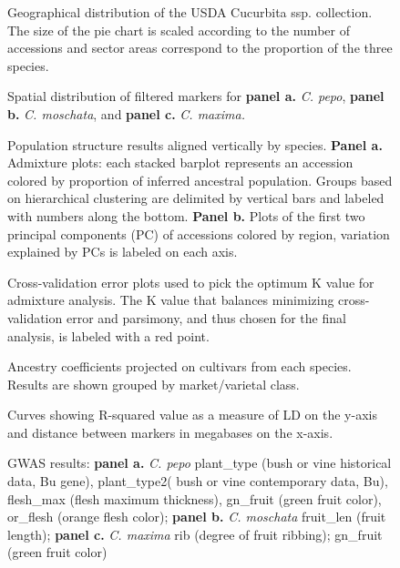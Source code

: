 \documentclass[utf8]{FrontiersinHarvard} %
\begin{document}
\begin{figure}[h]
	\caption{Geographical distribution of the USDA Cucurbita ssp. collection. The size of the pie chart is scaled according to the number of accessions and sector areas correspond to the proportion of the three species. \label{fig:1}}
\end{figure}

\begin{figure}[h]
	\caption{Spatial distribution of filtered markers for \textbf{panel a.} \textit{C. pepo}, \textbf{panel b.} \textit{C. moschata}, and \textbf{panel c.} \textit{C. maxima.} \label{fig:2}}
\end{figure}

\begin{figure}[h]
	\caption{Population structure results aligned vertically by species. \textbf{Panel a.} Admixture plots: each stacked barplot represents an accession colored by proportion of inferred ancestral population. Groups based on hierarchical clustering are delimited by vertical bars and labeled with numbers along the bottom. \textbf{Panel b.} Plots of the first two principal components (PC) of accessions colored by region, variation explained by PCs is labeled on each axis. \label{fig:3}}
\end{figure}

\begin{figure}[h]
	\caption{Cross-validation error plots used to pick the optimum K value for admixture analysis. The K value that balances minimizing cross-validation error and parsimony, and thus chosen for the final analysis, is labeled with a red point. \label{fig:4}}
\end{figure}


\begin{figure}[h]
	\caption{Ancestry coefficients projected on cultivars from each species. Results are shown grouped by market/varietal class. \label{fig:5}}
\end{figure}

\begin{figure}[h]
	\caption{Curves showing R-squared value as a measure of LD on the y-axis and distance between markers in megabases on the x-axis. \label{fig:6}}
\end{figure}

\begin{figure}[h]
	\caption{ \label{fig:7}}
\end{figure}


\begin{figure}[h]
	\caption{GWAS results: \textbf{panel a.} \textit{C. pepo} plant\_type (bush or vine historical data, Bu gene), plant\_type2( bush or vine contemporary data, Bu), flesh\_max (flesh maximum thickness), gn\_fruit (green fruit color), or\_flesh (orange flesh color); \textbf{panel b.} \textit{C. moschata} fruit\_len (fruit length); \textbf{panel c.} \textit{C. maxima} rib (degree of fruit ribbing); gn\_fruit (green fruit color) \label{fig:8}}
\end{figure}
\end{document}
